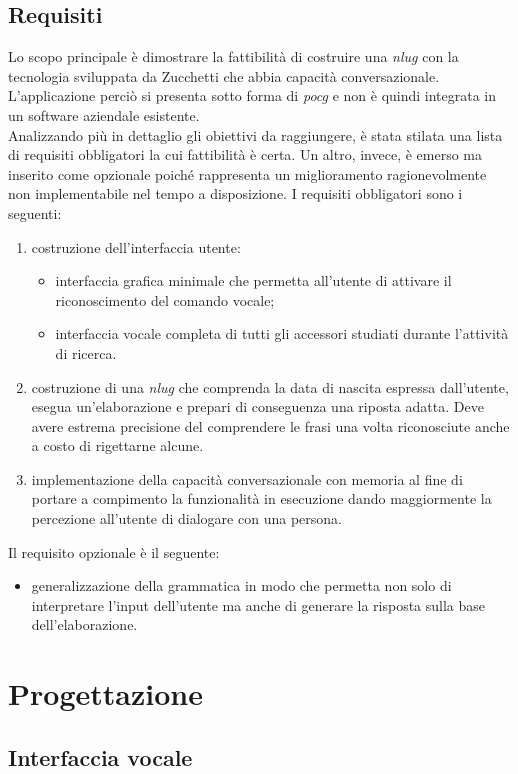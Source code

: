 	\subsection{Requisiti}
	Lo scopo principale è dimostrare la fattibilità di costruire una \emph{\gls{nlug}} con la tecnologia sviluppata da Zucchetti che abbia capacità conversazionale. L'applicazione perciò si presenta sotto forma di \emph{\gls{pocg}} e non è quindi integrata in un software aziendale esistente. \\
	Analizzando più in dettaglio gli obiettivi da raggiungere, è stata stilata una lista di requisiti obbligatori la cui fattibilità è certa. Un altro, invece, è emerso ma inserito come opzionale poiché rappresenta un miglioramento ragionevolmente non implementabile nel tempo a disposizione.
	I requisiti obbligatori sono i seguenti:
	\begin{enumerate}
		\item costruzione dell'interfaccia utente:
			\begin{itemize}
				\item interfaccia grafica minimale che permetta all'utente di attivare il riconoscimento del comando vocale;
				\item interfaccia vocale completa di tutti gli accessori studiati durante l'attività di ricerca.
			\end{itemize}
		\item costruzione di una \emph{\gls{nlug}} che comprenda la data di nascita espressa dall'utente, esegua un'elaborazione e prepari di conseguenza una riposta adatta. Deve avere estrema precisione del comprendere le frasi una volta riconosciute anche a costo di rigettarne alcune.
		\item implementazione della capacità conversazionale con memoria al fine di portare a compimento la funzionalità in esecuzione dando maggiormente la percezione all'utente di dialogare con una persona.
	\end{enumerate}
	Il requisito opzionale è il seguente:
	\begin{itemize}
		\item generalizzazione della grammatica in modo che permetta non solo di interpretare l'input dell'utente ma anche di generare la risposta sulla base dell'elaborazione.
	\end{itemize}
\section{Progettazione}
	\subsection{Interfaccia vocale}
